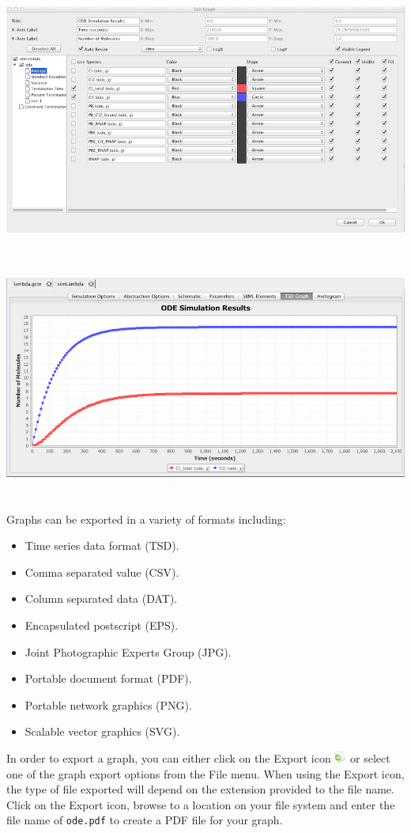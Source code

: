\documentclass[titlepage,11pt]{article}
\begin{document}
\begin{center}
\includegraphics[height=90mm]{screenshots/odeResults}\\
\includegraphics[height=80mm]{screenshots/odeSimResults}
\end{center}

Graphs can be exported in a variety of formats including:
\begin{itemize}
\item Time series data format (TSD).
\item Comma separated value (CSV).
\item Column separated data (DAT).
\item Encapsulated postscript (EPS). 
\item Joint Photographic Experts Group (JPG). 
\item Portable document format (PDF).
\item Portable network graphics (PNG). 
\item Scalable vector graphics (SVG).
\end{itemize}
In order to export a graph, you can either click on the Export icon \includegraphics{../gui/icons/export} or select one of the graph export options from the File menu.  When using the Export icon, the type of file exported will depend on the extension provided to the file name.  Click on the Export icon, browse to a location on your file system and enter the file name of {\tt ode.pdf} to create a PDF file for your graph.
\end{document}
